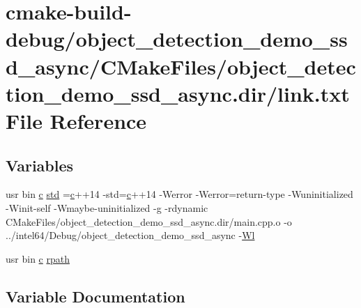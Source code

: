 \hypertarget{object__detection__demo__ssd__async_2CMakeFiles_2object__detection__demo__ssd__async_8dir_2link_8txt}{}\section{cmake-\/build-\/debug/object\+\_\+detection\+\_\+demo\+\_\+ssd\+\_\+async/\+C\+Make\+Files/object\+\_\+detection\+\_\+demo\+\_\+ssd\+\_\+async.dir/link.txt File Reference}
\label{object__detection__demo__ssd__async_2CMakeFiles_2object__detection__demo__ssd__async_8dir_2link_8txt}
\subsection*{Variables}
\begin{DoxyCompactItemize}
\item 
usr bin \hyperlink{CMakeCache_8txt_aac1d6a1710812201527c735f7c6afbaa}{c} \hyperlink{object__detection__demo__ssd__async_2CMakeFiles_2object__detection__demo__ssd__async_8dir_2link_8txt_a1ccfea5f558575a112db71eeb271fabf}{std} =\hyperlink{CMakeCache_8txt_aac1d6a1710812201527c735f7c6afbaa}{c}++14 -\/std=\hyperlink{CMakeCache_8txt_aac1d6a1710812201527c735f7c6afbaa}{c}++14 -\/Werror -\/Werror=return-\/type -\/Wuninitialized -\/Winit-\/self -\/Wmaybe-\/uninitialized -\/g -\/rdynamic C\+Make\+Files/object\+\_\+detection\+\_\+demo\+\_\+ssd\+\_\+async.\+dir/main.\+cpp.\+o -\/o ../intel64/Debug/object\+\_\+detection\+\_\+demo\+\_\+ssd\+\_\+async -\/\hyperlink{thirdparty_2extension_2CMakeFiles_2cpu__extension_8dir_2link_8txt_af9ccbf658ed2deb89d0d79f211e5b033}{Wl}
\item 
usr bin \hyperlink{CMakeCache_8txt_aac1d6a1710812201527c735f7c6afbaa}{c} \hyperlink{object__detection__demo__ssd__async_2CMakeFiles_2object__detection__demo__ssd__async_8dir_2link_8txt_ab9d7fd7120fafa2118a4e08c1df697c7}{rpath}
\end{DoxyCompactItemize}


\subsection{Variable Documentation}
